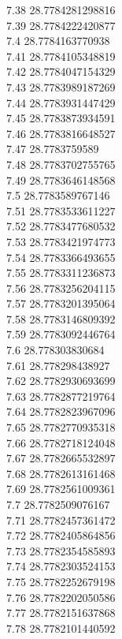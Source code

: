 {7.38	28.7784281298816\\
7.39	28.7784222420877\\
7.4	28.7784163770938\\
7.41	28.7784105348819\\
7.42	28.7784047154329\\
7.43	28.7783989187269\\
7.44	28.7783931447429\\
7.45	28.7783873934591\\
7.46	28.7783816648527\\
7.47	28.7783759589\\
7.48	28.7783702755765\\
7.49	28.7783646148568\\
7.5	28.7783589767146\\
7.51	28.7783533611227\\
7.52	28.7783477680532\\
7.53	28.7783421974773\\
7.54	28.7783366493655\\
7.55	28.7783311236873\\
7.56	28.7783256204115\\
7.57	28.7783201395064\\
7.58	28.7783146809392\\
7.59	28.7783092446764\\
7.6	28.778303830684\\
7.61	28.778298438927\\
7.62	28.7782930693699\\
7.63	28.7782877219764\\
7.64	28.7782823967096\\
7.65	28.7782770935318\\
7.66	28.7782718124048\\
7.67	28.7782665532897\\
7.68	28.7782613161468\\
7.69	28.7782561009361\\
7.7	28.7782509076167\\
7.71	28.7782457361472\\
7.72	28.7782405864856\\
7.73	28.7782354585893\\
7.74	28.7782303524153\\
7.75	28.7782252679198\\
7.76	28.7782202050586\\
7.77	28.7782151637868\\
7.78	28.7782101440592\\
}
